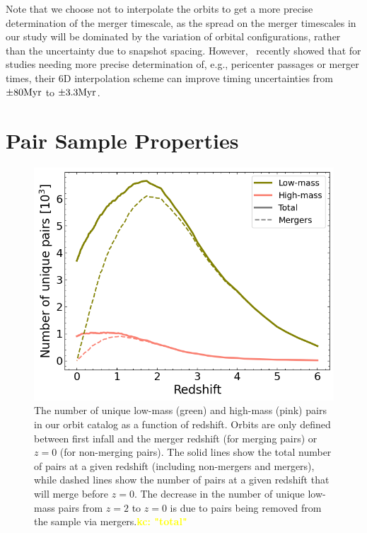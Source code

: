 \documentclass[twocolumn,linenumbers]{aastex631}
\newcommand{\kc}[1]{\textcolor{yellow}{\textbf{kc: #1}} }
\begin{document}
Note that we choose not to interpolate the orbits to get a more precise determination of the merger timescale, as the spread on the merger timescales in our study will be dominated by the variation of orbital configurations, rather than the uncertainty due to snapshot spacing. However,~\citet{Patton2024} recently showed that for studies needing more precise determination of, e.g., pericenter passages or merger times, their 6D interpolation scheme can improve timing uncertainties from $\pm80\mathrm{Myr}$ to $\pm3.3\mathrm{Myr}$.

\section{Pair Sample Properties}\label{sec:pairprops}
\begin{figure}[tb]
    \begin{center}
    \includegraphics[width=\columnwidth]{plots/bet-on-it/6_paircount.png}
    \caption{The number of unique low-mass (green) and high-mass (pink) pairs in our orbit catalog as a function of redshift. Orbits are only defined between first infall and the merger redshift (for merging pairs) or $z=0$ (for non-merging pairs). 
    The solid lines show the total number of pairs at a given redshift (including non-mergers and mergers), while dashed lines show the number of pairs at a given redshift that will merge before $z=0$.
    The decrease in the number of unique low-mass pairs from $z=2$ to $z=0$ is due to pairs being removed from the sample via mergers.\kc{"total"}
    }
    \label{fig:numorbits}
    \end{center}
\end{figure}
\end{document}
